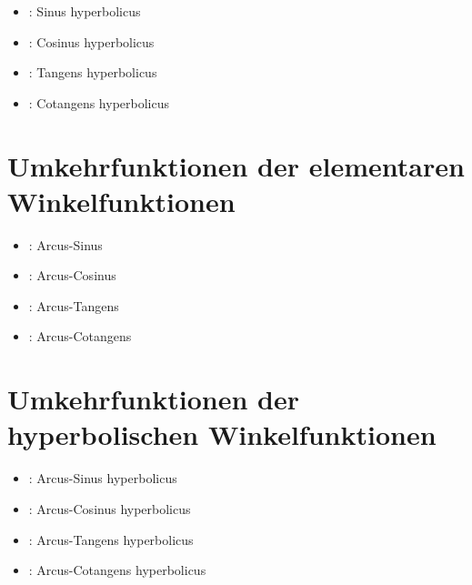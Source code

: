 \begin{itemize}

\item
{}:
Sinus hyperbolicus

\item
{}:
Cosinus hyperbolicus

\item
{}:
Tangens hyperbolicus

\item
{}:
Cotangens hyperbolicus

\end{itemize}



\section{Umkehrfunktionen der elementaren Winkelfunktionen}

\begin{itemize}

\item
{}:
Arcus-Sinus

\item
{}:
Arcus-Cosinus

\item
{}:
Arcus-Tangens

\item
{}:
Arcus-Cotangens

\end{itemize}



\section{Umkehrfunktionen der hyperbolischen Winkelfunktionen}

\begin{itemize}

\item
{}:
Arcus-Sinus hyperbolicus

\item
{}:
Arcus-Cosinus hyperbolicus

\item
{}:
Arcus-Tangens hyperbolicus

\item
{}:
Arcus-Cotangens hyperbolicus

\end{itemize}



